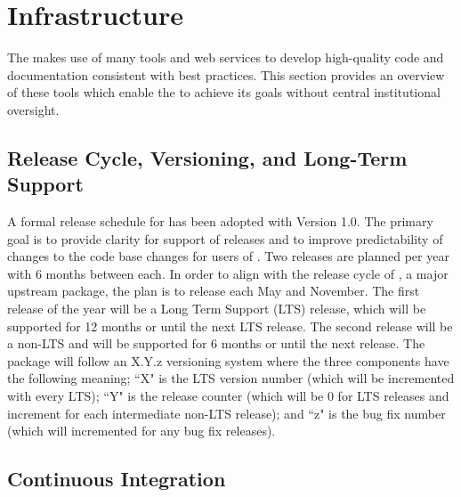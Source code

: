 \section{Infrastructure}
\label{sec:infrastructure}

The \sunpyproj makes use of many tools and web services to develop high-quality code and documentation consistent with best practices.
This section provides an overview of these tools which enable the \sunpyproj to achieve its goals without central institutional oversight.

\subsection{Release Cycle, Versioning, and Long-Term Support}
\label{sec:release}

A formal release schedule for \sunpypkg has been adopted with Version 1.0.
The primary goal is to provide clarity for support of releases and to improve predictability of changes to the code base changes for users of \sunpypkg.
Two releases are planned per year with 6 months between each.
In order to align with the release cycle of \astropypkg, a major upstream package, the plan is to release each May and November.
The first release of the year will be a Long Term Support (LTS) release, which will be supported for 12 months or until the next LTS release.
The second release will be a non-LTS and will be supported for 6 months or until the next release.
The \sunpypkg package will follow an X.Y.z versioning system where the three components have the following meaning; 
``X" is the LTS version number (which will be incremented with every LTS);
``Y" is the release counter (which will be 0 for LTS releases and increment for each intermediate non-LTS release);
and ``z" is the bug fix number (which will incremented for any bug fix releases).
\subsection{Continuous Integration}
\label{sec:continuous-integration}


